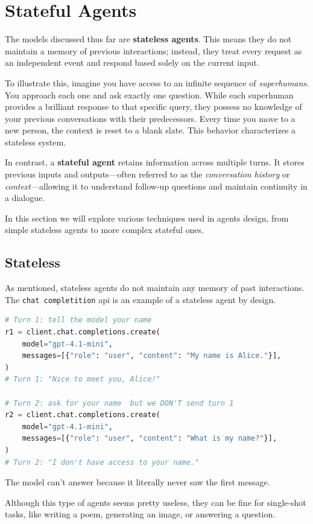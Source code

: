\section{Stateful Agents}
The models discussed thus far are \textbf{stateless agents}. 
This means they do not maintain a memory of previous interactions; instead, they treat every request as an independent event and respond based solely on the current input.

To illustrate this, imagine you have access to an infinite sequence of \textit{superhumans}. 
You approach each one and ask exactly one question. While each superhuman provides a brilliant response 
to that specific query, they possess no knowledge of your previous conversations with their predecessors. 
Every time you move to a new person, the context is reset to a blank slate. This behavior characterizes a stateless system.

In contrast, a \textbf{stateful agent} retains information across multiple turns. 
It stores previous inputs and outputs—often referred to as the \textit{conversation history} or \textit{context}—allowing 
it to understand follow-up questions and maintain continuity in a dialogue.

In this section we will explore various techniques used in agents design, from simple stateless agents to more complex stateful ones.

\subsection{Stateless}
As mentioned, stateless agents do not maintain any memory of past interactions. The \texttt{chat completition}
api is an example of a stateless agent by design.
\begin{lstlisting}[language=Python]
# Turn 1: tell the model your name
r1 = client.chat.completions.create(
    model="gpt-4.1-mini",
    messages=[{"role": "user", "content": "My name is Alice."}],
)
# Turn 1: "Nice to meet you, Alice!"

# Turn 2: ask for your name  but we DON'T send turn 1
r2 = client.chat.completions.create(
    model="gpt-4.1-mini",
    messages=[{"role": "user", "content": "What is my name?"}],
)
# Turn 2: "I don't have access to your name."
\end{lstlisting}
The model can't answer because it literally never saw the first message.

Although this type of agents seems pretty useless, they can be fine for single-shot tasks,
like writing a poem, generating an image, or answering a question.

